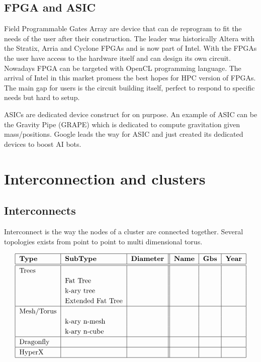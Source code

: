 \subsection{FPGA and ASIC}
Field Programmable Gates Array are device that can de reprogram to fit the needs of the user after their construction.
The leader was historically Altera with the Stratix, Arria and Cyclone FPGAs and is now part of Intel. 
With the FPGAs the user have access to the hardware itself and can design its own circuit. 
Nowadays FPGA can be targeted with OpenCL programming language. 
The arrival of Intel in this market promess the best hopes for HPC version of FPGAs. 
The main gap for users is the circuit building itself, perfect to respond to specific needs but hard to setup. 

ASICs are dedicated device construct for on purpose. 
An example of ASIC can be the Gravity Pipe (GRAPE) which is dedicated to compute gravitation given mass/positions.
Google leads the way for ASIC and just created its dedicated devices to boost AI bots. 

\section{Interconnection and clusters}

\subsection{Interconnects}
Interconnect is the way the nodes of a cluster are connected together. 
Several topologies exists from point to point to multi dimensional torus.

\begin{table}
\begin{center}
\[\arraycolsep=0.pt\def\arraystretch{1.2}
\begin{tabular}{| l | l | l || l | l | l | }
\hline
\textbf{Type} & \textbf{SubType} & \textbf{Diameter} & \textbf{Name} & \textbf{Gbs} & \textbf{Year} \\
\hline
\hline
Trees & & & & & \\
& Fat Tree & & & & \\
& k-ary tree & & & & \\
& Extended Fat Tree & & & &\\
\hline
Mesh/Torus & & & & & \\
& k-ary n-mesh & & & & \\
& k-ary n-cube & & & & \\
\hline
Dragonfly & & & & & \\
\hline
HyperX & & & & &  \\
\hline
\end{tabular}
\]
\caption{InfiniBand technologies}
\label{fig:1_HPC:topology}
\end{center}
\end{table}


